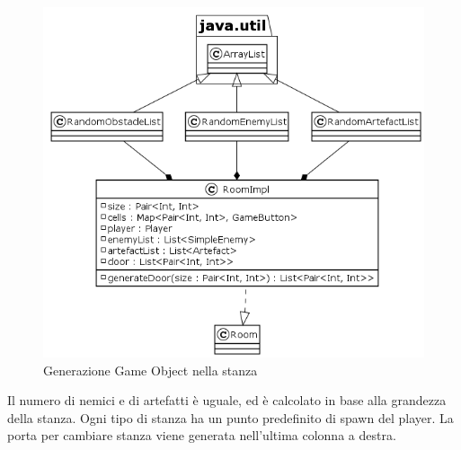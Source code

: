 \documentclass[a4paper,titlepage,12pt]{article}
\begin{document}
\begin{figure}[H]
    \centering
    \includegraphics[scale=0.7]{img/uml/Room2.png}
    \caption{Generazione Game Object nella stanza}
    \label{fig: Stanza}
\end{figure}
\par \noindent Il numero di nemici e di artefatti è uguale, ed è calcolato in base alla grandezza della stanza. Ogni tipo di stanza ha un punto predefinito di spawn del player. La porta per cambiare stanza viene generata nell’ultima colonna a destra.
\newpage
\end{document}
